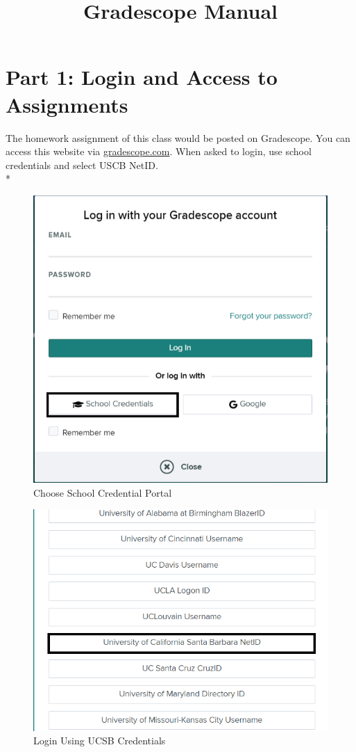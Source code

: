 \documentclass{article}
\title{\vspace{-2cm}\myfont Gradescope Manual}
\date{\vspace{-5ex}}
\begin{document}
  \maketitle

\section{Part 1: Login and Access to Assignments}
\hspace{\parindent}The homework assignment of this class would be posted on Gradescope. You can access this website via \href{http://www.gradescope.com}{gradescope.com}. %
When asked to login, use school credentials and select USCB NetID.\\*
\begin{figure}[h!]
\centerline{\includegraphics[scale=.5]{login_1.png}}
\caption{Choose School Credential Portal}
\label{fig}
\end{figure}
\begin{figure}[H]
\centerline{\includegraphics[scale=.5]{login_2.png}}
\caption{Login Using UCSB Credentials}
\label{fig}
\end{figure}
\end{document}
